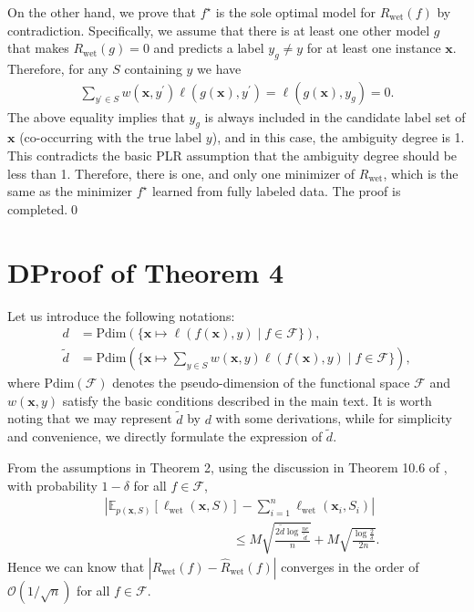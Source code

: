 \documentclass[letterpaper]{article} %
\begin{document}
On the other hand, we prove that $f^\star$ is the sole optimal model for $R_{\mathrm{wet}}(f)$ by contradiction. Specifically, we assume that there is at least one other model $g$ that makes $R_{\mathrm{wet}}(g)=0$ and predicts a label $y_{g} \neq y$ for at least one instance $\bm{x}$. Therefore, for any $S$ containing $y$ we have
\begin{gather}
\nonumber
\sum\nolimits_{y^\prime\in S}w(\bm{x},y^\prime)\ell(g(\bm{x}), y^\prime)=\ell(g(\bm{x}), y_{g})=0.
\end{gather}
The above equality implies that $y_{g}$ is always included in the candidate label set of $\bm{x}$ (co-occurring with the true label $y$), and in this case, the ambiguity degree is 1. This contradicts the basic PLR assumption that the ambiguity degree should be less than 1. Therefore, there is one, and only one minimizer of $R_{\mathrm{wet}}$, which is the same as the minimizer $f^\star$ learned from fully labeled data. The proof is completed.\qed

\section{D\quad Proof of Theorem 4}
Let us introduce the following notations: 
\begin{align}
\nonumber
d &=\mathrm{Pdim}(\{\bm{x}\mapsto \ell(f(\bm{x}),y)\mid f\in\mathcal{F}\}),\\
\nonumber
\tilde{d} &= \mathrm{Pdim}(\{\bm{x}\mapsto \sum_{y\in S}w(\bm{x},y)\ell(f(\bm{x}),y)\mid f\in\mathcal{F}\}),
\end{align}
where $\mathrm{Pdim}(\mathcal{F})$ denotes the pseudo-dimension of the functional space $\mathcal{F}$ and $w(\bm{x},y)$ satisfy the basic conditions described in the main text. It is worth noting that we may represent $\tilde{d}$ by $d$ with some derivations, while for simplicity and convenience, we directly formulate the expression of $\tilde{d}$.

From the assumptions in Theorem 2, using the discussion in Theorem 10.6 of \citet{mohri2012foundations}, with probability $1-\delta$ for all $f\in\mathcal{F}$,
\begin{align}
\nonumber
&\left|\mathbb{E}_{p(\bm{x},S)}[\ell_{\mathrm{wet}}(\bm{x},S)] - \sum_{i=1}^n\ell_{\mathrm{wet}}(\bm{x}_i,S_i)\right| \\
\nonumber
&\qquad\qquad\qquad\qquad\qquad\leq M\sqrt{\frac{2\tilde{d}\log\frac{ne}{\tilde{d}}}{n}}+M\sqrt{\frac{\log\frac{2}{\delta}}{2n}}.
\end{align}
Hence we can know that $\left|R_{\mathrm{wet}}(f)-\widehat{R}_{\mathrm{wet}}(f)\right|$ converges in the order of $\mathcal{O}(1/\sqrt{n})$ for all $f\in\mathcal{F}$.
\end{document}

